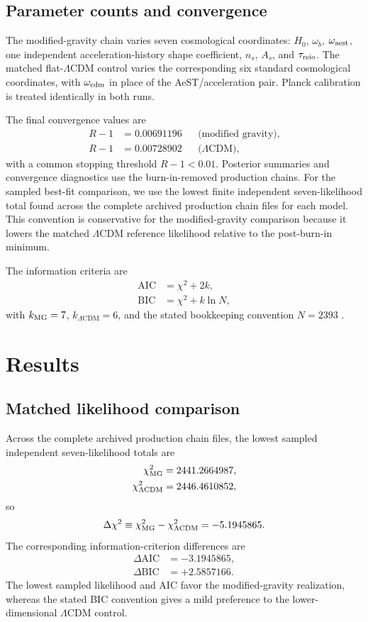 \documentclass[aps,prd,twocolumn,superscriptaddress,nofootinbib,longbibliography,floatfix]{revtex4-2}
\newcommand{\LCDM}{\Lambda\mathrm{CDM}}
\begin{document}
\subsection{Parameter counts and convergence}
The modified-gravity chain varies seven cosmological coordinates: $H_0$, $\omega_b$, $\omega_{\rm aest}$, one independent acceleration-history shape coefficient, $n_s$, $A_s$, and $\tau_{\rm reio}$. The matched flat-$\LCDM$ control varies the corresponding six standard cosmological coordinates, with $\omega_{\rm cdm}$ in place of the AeST/acceleration pair. Planck calibration is treated identically in both runs.

The final convergence values are
\begin{align}
R-1&=0.00691196 &&\text{(modified gravity)},\\
R-1&=0.00728902 &&\text{($\LCDM$)},
\end{align}
with a common stopping threshold $R-1<0.01$. Posterior summaries and convergence diagnostics use the burn-in-removed production chains. For the sampled best-fit comparison, we use the lowest finite independent seven-likelihood total found across the complete archived production chain files for each model. This convention is conservative for the modified-gravity comparison because it lowers the matched $\LCDM$ reference likelihood relative to the post-burn-in minimum.

The information criteria are
\begin{align}
\mathrm{AIC}&=\chi^2+2k,\label{eq:aic}\\
\mathrm{BIC}&=\chi^2+k\ln N,\label{eq:bic}
\end{align}
with $k_{\rm MG}=7$, $k_{\LCDM}=6$, and the stated bookkeeping convention $N=2393$ \cite{Akaike1974,Schwarz1978,Liddle2007}.

\section{Results}\label{sec:results}
\subsection{Matched likelihood comparison}
Across the complete archived production chain files, the lowest sampled independent seven-likelihood totals are
\begin{align}
\chi^2_{\rm MG}&=2441.2664987,\\
\chi^2_{\LCDM}&=2446.4610852,
\end{align}
so
\begin{equation}
\Delta\chi^2\equiv\chi^2_{\rm MG}-\chi^2_{\LCDM}=-5.1945865.
\end{equation}
The corresponding information-criterion differences are
\begin{align}
\Delta\mathrm{AIC}&=-3.1945865,\\
\Delta\mathrm{BIC}&=+2.5857166.
\end{align}
The lowest sampled likelihood and AIC favor the modified-gravity realization, whereas the stated BIC convention gives a mild preference to the lower-dimensional $\LCDM$ control.
\end{document}
